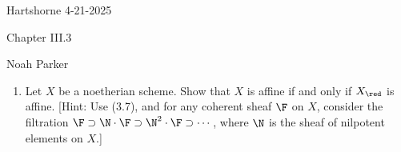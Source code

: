 \documentclass[12pt]{amsart}
\begin{document}
{Hartshorne} \hfill {4-21-2025}

\bigskip\bigskip

\begin{center}

{\sc Chapter III.3}

\end{center}

\begin{center}

  {Noah Parker} 
    
\end{center}

\bigskip\bigskip

\begin{enumerate}
  \item[3.1.] {
      Let $X$ be a noetherian scheme.
      Show that $X$ is affine if and only if $X_{\red}$ is affine.
      [Hint: Use (3.7), and for any coherent sheaf $\F$ on $X$, consider the filtration $\F\supset \N\cdot \F\supset \N^2\cdot\F\supset\cdots$, where $\N$ is the sheaf of nilpotent elements on $X$.]
    }
\end{enumerate}
\end{document}
